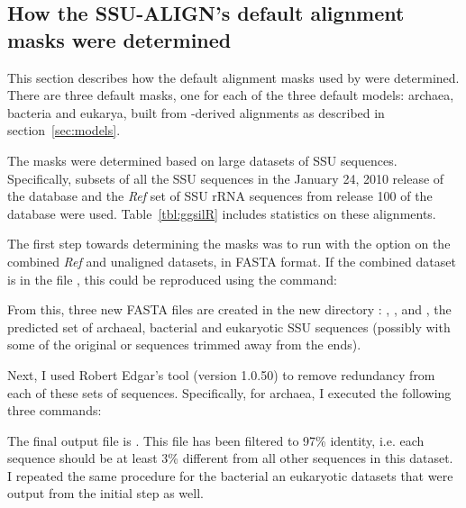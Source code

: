 \subsection{How the SSU-ALIGN's default alignment masks were determined}
\label{sec:masks}

This section describes how the default alignment masks used by
 were determined. There are three default masks,
one for each of the three default models: archaea, bacteria and
eukarya, built from -derived alignments as described in
section~\ref{sec:models}. 

The masks were determined based on large datasets
of SSU sequences. Specifically, subsets of all the SSU sequences in
the  January 24, 2010 release of the  database 
\cite{DeSantis06} and the \emph{Ref} set of SSU rRNA sequences from
release 100 of the  database
\cite{Pruesse07} were used. Table~\ref{tbl:ggsilR} includes statistics
on these alignments. 

The first step towards determining the masks was to run
 with the  option on the combined
 \emph{Ref} and  unaligned
datasets, in FASTA format. If the combined dataset is in the file
, this could be reproduced using the command:


From this, three new FASTA files are created in the new directory
: , ,
and , 
the predicted set of archaeal, bacterial and eukaryotic
SSU sequences (possibly with some of the original
 or  sequences trimmed away from
the ends). 

Next, I used Robert Edgar's  tool (version 1.0.50) to
remove redundancy from each of these sets of sequences. Specifically, for
archaea, I executed the following three  commands:




The final output file is . This file has
been filtered to 97\% identity, i.e. each sequence should be at least
3\% different from all other sequences in this dataset. I repeated the
same procedure for the bacterial an eukaryotic datasets that were
output from the initial  step as well.

